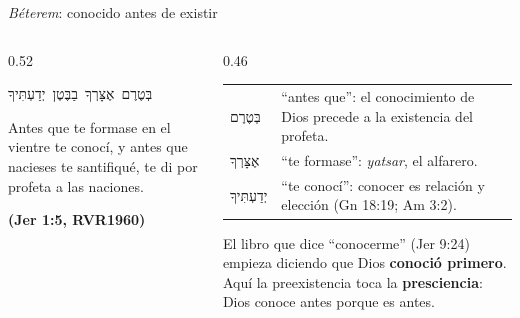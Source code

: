 \documentclass[hyperref={bookmarks=false},aspectratio=169]{beamer}
\newcommand{\heb}[1]{\mbox{\foreignlanguage{hebrew}{#1}}}
\newcommand{\fuente}[1]{\par\hfill{\upshape\bfseries\footnotesize\textcolor{azul}{#1}}}
\newcommand{\destacar}[1]{\textbf{\textcolor{azul}{#1}}}
\begin{document}
\begin{frame}{\emph{Béterem}: conocido antes de existir}
\begin{columns}[t,onlytextwidth]
\begin{column}{0.52\textwidth}
\begin{center}\heb{בְּטֶרֶם אֶצָּרְךָ בַבֶּטֶן יְדַעְתִּיךָ}\end{center}
\begin{cita}Antes que te formase en el vientre te conocí, y antes que nacieses te santifiqué, te di por profeta a las naciones.\fuente{(Jer 1:5, RVR1960)}\end{cita}
\end{column}
\begin{column}{0.46\textwidth}\scriptsize\renewcommand{\arraystretch}{1.12}
\begin{tabular}{@{}>{\RaggedRight\arraybackslash}p{1.5cm}>{\RaggedRight\arraybackslash}p{3.9cm}@{}}
\toprule
\heb{בְּטֶרֶם} & ``antes que'': el conocimiento de Dios precede a la existencia del profeta. \\
\heb{אֶצָּרְךָ} & ``te formase'': \emph{yatsar}, el alfarero. \\
\heb{יְדַעְתִּיךָ} & ``te conocí'': conocer es relación y elección (Gn 18:19; Am 3:2). \\
\bottomrule
\end{tabular}\par\medskip
\small El libro que dice ``conocerme'' (Jer 9:24) empieza diciendo que Dios \destacar{conoció primero}. Aquí la preexistencia toca la \destacar{presciencia}: Dios conoce antes porque es antes.
\end{column}
\end{columns}
\end{frame}
\end{document}
